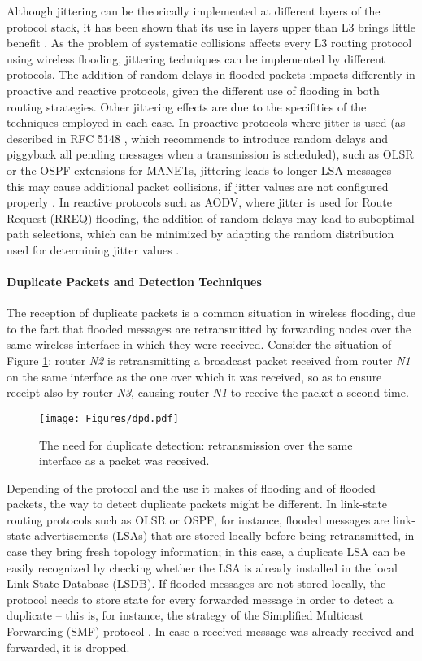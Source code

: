 Although jittering can be theorically implemented at different layers of the protocol stack, it has been shown that its use in layers upper than L3 brings little benefit \cite{jitter-broadcast}. As the problem of systematic collisions affects every L3 routing protocol using wireless flooding, jittering techniques can be implemented by different protocols. The addition of random delays in flooded packets impacts differently in proactive and reactive protocols, given the different use of flooding in both routing strategies. Other jittering effects are due to the specifities of the techniques employed in each case. In proactive protocols where jitter is used (as described in RFC 5148 \cite{rfc5148}, which recommends to introduce random delays and piggyback all pending messages when a transmission is scheduled), such as OLSR or the OSPF extensions for MANETs, jittering leads to longer LSA messages -- this may cause additional packet collisions, if jitter values are not configured properly \cite{INFOCOM-jitter,jitter-wpc}. In reactive protocols such as AODV, where jitter is used for Route Request (RREQ) flooding, the addition of random delays may lead to suboptimal path selections, which can be minimized by adapting the random distribution used for determining jitter values \cite{Infocom12, wiopt}.  

\paragraph{Duplicate Packets and Detection Techniques}

The reception of duplicate packets is a common situation in wireless flooding, due to the fact that flooded messages are retransmitted by forwarding nodes over the same wireless interface in which they were received. Consider the situation of Figure \ref{f:dpd}: router \textit{N2} is retransmitting a broadcast packet received from router \textit{N1} on the same interface as the one over which it was received, so as to ensure receipt also by router \textit{N3}, causing router \textit{N1} to receive the packet a second time.

\begin{figure}[ht]
\centering
\texttt{[image: Figures/dpd.pdf]}
\caption{The need for duplicate detection: retransmission over the same interface as a packet was received.}
\label{f:dpd}
\end{figure}

Depending of the protocol and the use it makes of flooding and of flooded packets, the way to detect duplicate packets might be different. In link-state routing protocols such as OLSR or OSPF, for instance, flooded messages are link-state advertisements (LSAs) that are stored locally before being retransmitted, in case they bring fresh topology information; in this case, a duplicate LSA can be easily recognized by checking whether the LSA is already installed in the local Link-State Database (LSDB). If flooded messages are not stored locally, the protocol needs to store state for every forwarded message in order to detect a duplicate -- this is, for instance, the strategy of the Simplified Multicast Forwarding (SMF) protocol \cite{rfc6621}. In case a received message was already received and forwarded, it is dropped.

